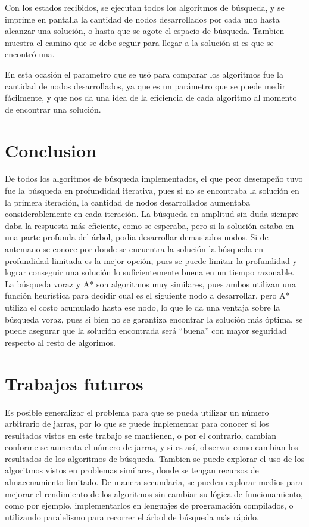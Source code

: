 \documentclass[journal]{IEEEtran}
\begin{document}
Con los estados recibidos, se ejecutan todos los algoritmos de búsqueda, y se imprime en pantalla la cantidad de nodos desarrollados por cada uno hasta alcanzar una solución, o hasta que se agote el espacio de búsqueda. Tambien muestra el camino que se debe seguir para llegar a la solución si es que se encontró una.

En esta ocasión el parametro que se usó para comparar los algoritmos fue la cantidad de nodos desarrollados, ya que es un parámetro que se puede medir fácilmente, y que nos da una idea de la eficiencia de cada algoritmo al momento de encontrar una solución.

\section{Conclusion}
De todos los algoritmos de búsqueda implementados, el que peor desempeño tuvo fue la búsqueda en profundidad iterativa, pues si no se encontraba la solución en la primera iteración, la cantidad de nodos desarrollados aumentaba considerablemente en cada iteración. La búsqueda en amplitud sin duda siempre daba la respuesta más eficiente, como se esperaba, pero si la solución estaba en una parte profunda del árbol, podia desarrollar demasiados nodos. Si de antemano se conoce por donde se encuentra la solución la búsqueda en profundidad limitada es la mejor opción, pues se puede limitar la profundidad y lograr conseguir una solución lo suficientemente buena en un tiempo razonable. La búsqueda voraz y A* son algoritmos muy similares, pues ambos utilizan una función heurística para decidir cual es el siguiente nodo a desarrollar, pero A* utiliza el costo acumulado hasta ese nodo, lo que le da una ventaja sobre la búsqueda voraz, pues si bien no se garantiza encontrar la solución más óptima, se puede asegurar que la solución encontrada será ``buena'' con mayor seguridad respecto al resto de algorimos.

\section{Trabajos futuros}
Es posible generalizar el problema para que se pueda utilizar un número arbitrario de jarras, por lo que se puede implementar para conocer si los resultados vistos en este trabajo se mantienen, o por el contrario, cambian conforme se aumenta el número de jarras, y si es así, observar como cambian los resultados de los algoritmos de búsqueda.
Tambien se puede explorar el uso de los algoritmos vistos en problemas similares, donde se tengan recursos de almacenamiento limitado.
De manera secundaria, se pueden explorar medios para mejorar el rendimiento de los algoritmos sin cambiar su lógica de funcionamiento, como por ejemplo, implementarlos en lenguajes de programación compilados, o utilizando paralelismo para recorrer el árbol de búsqueda más rápido.
\end{document}
